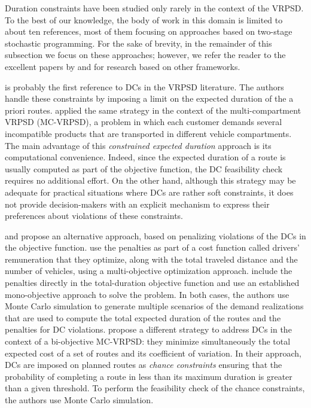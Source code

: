 Duration constraints have been studied only rarely in the context of the VRPSD. To the best of our knowledge, the body of work in this domain is limited to about ten references, most of them focusing on approaches based on two-stage stochastic programming. For the sake of brevity, in the remainder of this subsection we focus on these approaches; however, we refer the reader to the excellent papers by \citet{Bent2004,Bent2007} and \citet{Goodson2013,Goodson2013a} for research based on other frameworks.

\citet{Yang2000} is probably the first reference to DCs in the VRPSD literature. The authors handle these constraints by imposing a limit on the expected duration of the a priori routes. \citet{Mendoza2010,Mendoza2011} applied the same strategy in the context of the multi-compartment VRPSD (MC-VRPSD), a problem in which each customer demands several incompatible products that are transported in different vehicle compartments. The main advantage of this \emph{constrained expected duration} approach is its computational convenience. Indeed, since the expected duration of a route is usually computed as part of the objective function, the DC feasibility check requires no additional effort. On the other hand, although this strategy may be adequate for practical situations where DCs are rather soft constraints, it does not provide decision-makers with an explicit mechanism to express their preferences about violations of these constraints.

\citet{Tan2007} and \cite{Sorensen2009} propose an alternative approach, based on penalizing violations of the DCs in the objective function. \citet{Tan2007} use the penalties as part of a cost function called drivers' remuneration that they optimize, along with the total traveled distance and the number of vehicles, using a multi-objective optimization approach. \cite{Sorensen2009} include the penalties directly in the total-duration objective function and use an established mono-objective approach \citep{Sorensen2006a} to solve the problem. In both cases, the authors use Monte Carlo simulation to generate multiple scenarios of the demand realizations that are used to compute the total expected duration of the routes and the penalties for DC violations. \cite{Mendoza2009b} propose a different strategy to address DCs in the context of a bi-objective MC-VRPSD: they minimize simultaneously the total expected cost of a set of routes and its coefficient of variation. In their approach, DCs are imposed on planned routes as \emph{chance constraints} ensuring that the probability of completing a route in less than its maximum duration is greater than a given threshold. To perform the feasibility check of the chance constraints, the authors use Monte Carlo simulation.

